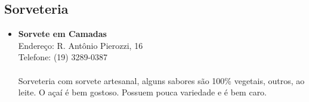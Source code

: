 \subsection{Sorveteria}

\begin{itemize}
\item \textbf{Sorvete em Camadas}
  \\Endereço: R. Antônio Pierozzi, 16
  \\Telefone: (19) 3289-0387
  \\
  \\Sorveteria com sorvete artesanal, alguns sabores são 100\% vegetais,
  outros, ao leite. O açaí é bem gostoso. Possuem pouca variedade e é bem
  caro.
\end{itemize}

